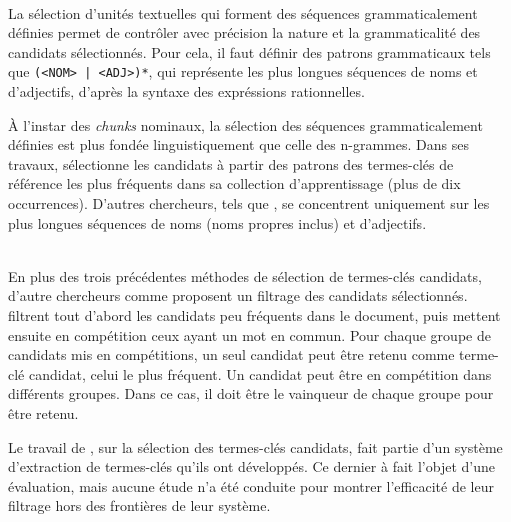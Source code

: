     \begin{example}
    \end{example}

    ~\\La sélection d'unités textuelles qui forment des séquences
    grammaticalement définies permet de contrôler
    avec précision la nature et la grammaticalité des candidats sélectionnés.
    Pour cela, il faut définir des patrons grammaticaux tels que \texttt{(<NOM>
    | <ADJ>)*}, qui représente les plus longues séquences de noms et
    d'adjectifs, d'après la syntaxe des expréssions rationnelles.

    À l'instar des \textit{chunks} nominaux, la sélection des séquences
    grammaticalement définies est plus fondée linguistiquement que celle des
    n-grammes. Dans ses travaux, 
    sélectionne les candidats à partir des patrons des termes-clés de référence
    les plus fréquents dans sa collection d'apprentissage (plus de dix
    occurrences). D'autres chercheurs, tels que , se
    concentrent uniquement sur les plus longues séquences de noms (noms propres
    inclus) et d'adjectifs.

    \begin{example}
    \end{example}

    ~\\En plus des trois précédentes méthodes de sélection de termes-clés
    candidats, d'autre chercheurs comme
     proposent un filtrage
    des candidats sélectionnés.
     filtrent tout d'abord
    les candidats peu fréquents dans le document, puis mettent ensuite en
    compétition ceux ayant un mot en commun. Pour chaque groupe de
    candidats mis en compétitions, un seul candidat peut être retenu comme
    terme-clé candidat, celui le plus fréquent. Un candidat peut être en
    compétition dans différents groupes. Dans ce cas, il doit être le
    \og{}vainqueur\fg{} de chaque groupe pour être retenu.

    Le travail de , sur la
    sélection des termes-clés candidats, fait partie d'un système d'extraction
    de termes-clés qu'ils ont développés. Ce dernier à fait l'objet d'une
    évaluation, mais aucune étude n'a été conduite pour montrer l'efficacité de
    leur filtrage hors des frontières de leur système.

